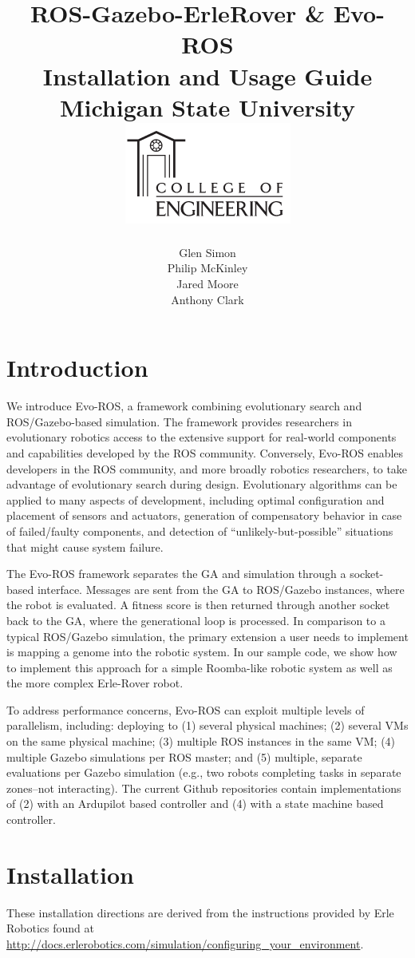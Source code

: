 \documentclass{report}
\title
{
	\textbf{{ROS-Gazebo-ErleRover \& Evo-ROS \\Installation and Usage Guide}\\
	{Michigan State University}\\}
	\includegraphics{Images/MSU_Lab_Cover_Image.png}
}
\author{Glen Simon\\
Philip McKinley\\
Jared Moore\\
Anthony Clark}
\begin{document}
\maketitle

\newpage
\tableofcontents
\clearpage

\chapter{Introduction}
We introduce Evo-ROS, a framework combining evolutionary search and ROS/Gazebo-based simulation. The framework provides researchers in evolutionary robotics access to the extensive support for real-world components and capabilities developed by the ROS community. Conversely, Evo-ROS enables developers in the ROS community, and more broadly robotics researchers, to take advantage of evolutionary search during design. Evolutionary algorithms can be applied to many aspects of development, including optimal configuration and
placement of sensors and actuators, generation of compensatory behavior in case of failed/faulty components, and detection of “unlikely-but-possible” situations that might cause system failure.

The Evo-ROS framework separates the GA and simulation through a socket-based interface. Messages are sent from the GA to ROS/Gazebo instances, where the robot is evaluated. A fitness score is then returned through another socket back to the GA, where the generational loop is processed. In comparison to a typical ROS/Gazebo simulation, the primary extension a user needs to implement is mapping a genome into the robotic system. In our sample code, we show how to implement this approach for a simple Roomba-like robotic system as well as the more complex Erle-Rover robot.

To address performance concerns, Evo-ROS can exploit multiple levels of parallelism, including: deploying to (1) several physical machines; (2) several VMs on the same physical machine; (3) multiple ROS instances in the same VM; (4) multiple Gazebo simulations per ROS master; and (5) multiple, separate evaluations per Gazebo simulation (e.g., two robots completing tasks in separate zones–not interacting). The current Github repositories contain implementations of (2) with an Ardupilot based controller and (4) with a state machine based controller.

\chapter{Installation}
These installation directions are derived from the instructions provided by Erle Robotics found at\\ \href{http://docs.erlerobotics.com/simulation/configuring\_your\_environment}{http://docs.erlerobotics.com/simulation/configuring\_your\_environment}.
\\
\end{document}

